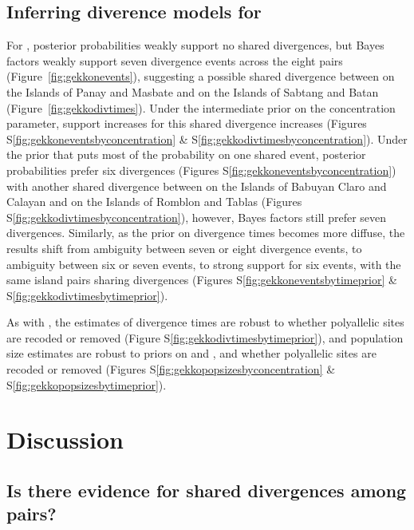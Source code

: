 \subsection{Inferring diverence models for }
For , posterior probabilities weakly support no shared divergences,
but Bayes factors weakly support seven divergence events across the eight pairs
(Figure~\ref{fig:gekkonevents}),
suggesting a possible shared divergence between
 on the Islands of Panay and Masbate
and
 on the Islands of Sabtang and Batan
(Figure~\ref{fig:gekkodivtimes}).
Under the intermediate prior on the concentration parameter, support
increases for this shared divergence increases 
(Figures
S\ref{fig:gekkoneventsbyconcentration}
\&
S\ref{fig:gekkodivtimesbyconcentration}).
Under the prior that puts most of the probability on one shared event,
posterior probabilities prefer six divergences
(Figures S\ref{fig:gekkoneventsbyconcentration})
with another shared divergence between
 on the Islands of Babuyan Claro and Calayan
and
 on the Islands of Romblon and Tablas
(Figures S\ref{fig:gekkodivtimesbyconcentration}), however,
Bayes factors still prefer seven divergences.
Similarly, as the prior on divergence times becomes more diffuse,
the results shift from ambiguity between seven or eight divergence
events, to ambiguity between six or seven events, to strong
support for six events, with the same island pairs sharing
divergences
(Figures
S\ref{fig:gekkoneventsbytimeprior}
\&
S\ref{fig:gekkodivtimesbytimeprior}).

As with , the estimates of divergence times
are robust to whether polyallelic sites are recoded or removed
(Figure S\ref{fig:gekkodivtimesbytimeprior}),
and population size estimates are robust to 
priors on \concentration and \divtime, and whether polyallelic sites
are recoded or removed
(Figures
S\ref{fig:gekkopopsizesbyconcentration}
\&
S\ref{fig:gekkopopsizesbytimeprior}).

\section{Discussion}

\subsection{Is there evidence for shared divergences among  pairs?}

